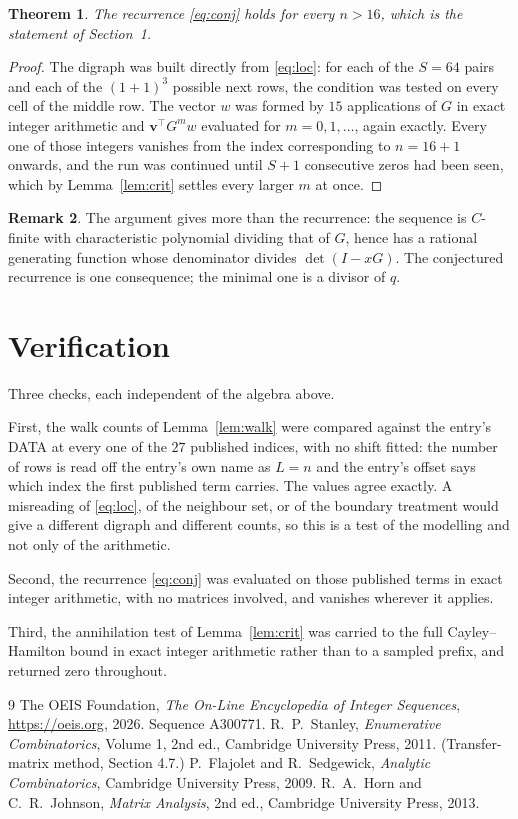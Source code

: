 \documentclass[11pt,a4paper]{article}
\theoremstyle{plain}
\newtheorem{theorem}{Theorem}
\theoremstyle{definition}
\newtheorem{remark}[theorem]{Remark}
\begin{document}
\begin{theorem}
The recurrence \eqref{eq:conj} holds for every $n>16$, which is the statement of
Section~1.
\end{theorem}

\begin{proof}
The digraph was built directly from \eqref{eq:loc}: for each of the $S=64$ pairs and each
of the $(1+1)^{3}$ possible next rows, the condition was tested on every cell of
the middle row. The vector $w$ was formed by $15$ applications of $G$ in exact integer
arithmetic and $\mathbf{v}^{\!\top}G^{m}w$ evaluated for $m=0,1,\dots$, again exactly.
Every one of those integers vanishes from the index corresponding to $n=16+1$ onwards,
and the run was continued until $S+1$ consecutive zeros had been seen, which by
Lemma~\ref{lem:crit} settles every larger $m$ at once.
\end{proof}

\begin{remark}
The argument gives more than the recurrence: the sequence is $C$-finite with characteristic
polynomial dividing that of $G$, hence has a rational generating function whose denominator
divides $\det(I-xG)$. The conjectured recurrence is one consequence; the minimal one is a
divisor of $q$.
\end{remark}

\section{Verification}

Three checks, each independent of the algebra above.

First, the walk counts of Lemma~\ref{lem:walk} were compared against the entry's DATA at
every one of the $27$ published indices, with no shift fitted: the number of rows is
read off the entry's own name as $L=n$ and the entry's offset says which index the first
published term carries. The values agree exactly. A misreading of \eqref{eq:loc}, of the
neighbour set, or of the boundary treatment would give a different digraph and different
counts, so this is a test of the modelling and not only of the arithmetic.

Second, the recurrence \eqref{eq:conj} was evaluated on those published terms in exact
integer arithmetic, with no matrices involved, and vanishes wherever it applies.

Third, the annihilation test of Lemma~\ref{lem:crit} was carried to the full
Cayley--Hamilton bound in exact integer arithmetic rather than to a sampled prefix, and
returned zero throughout.

\begin{thebibliography}{9}
 The OEIS Foundation, \emph{The On-Line Encyclopedia of Integer
Sequences}, \url{https://oeis.org}, 2026. Sequence A300771.
 R.~P.~Stanley, \emph{Enumerative Combinatorics}, Volume 1, 2nd ed.,
Cambridge University Press, 2011. (Transfer-matrix method, Section 4.7.)
 P.~Flajolet and R.~Sedgewick, \emph{Analytic Combinatorics}, Cambridge
University Press, 2009.
 R.~A.~Horn and C.~R.~Johnson, \emph{Matrix Analysis}, 2nd ed., Cambridge
University Press, 2013.
\end{thebibliography}
\end{document}
